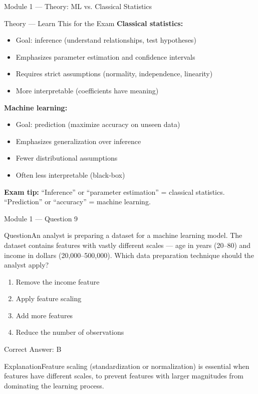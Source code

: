 \documentclass[aspectratio=169,10pt]{beamer}
\newcommand{\question}[1]{\begin{block}{Question}#1\end{block}}
\newcommand{\options}[4]{%
	\begin{enumerate}[label=\Alph*.,leftmargin=*]
		\item #1
		\item #2
		\item #3
		\item #4
	\end{enumerate}
}
\newcommand{\answerbox}[1]{\begin{exampleblock}{Correct Answer: #1}\end{exampleblock}}
\newcommand{\explain}[1]{\begin{block}{Explanation}#1\end{block}}
\newcommand{\theory}[1]{%
	\begin{block}{Theory --- Learn This for the Exam}
		\small #1
	\end{block}
}
\begin{document}
	\begin{frame}{Module 1 --- Theory: ML vs. Classical Statistics}
		\theory{
			\textbf{Classical statistics:}
			\begin{itemize}
				\item Goal: inference (understand relationships, test hypotheses)
				\item Emphasizes parameter estimation and confidence intervals
				\item Requires strict assumptions (normality, independence, linearity)
				\item More interpretable (coefficients have meaning)
			\end{itemize}
			\textbf{Machine learning:}
			\begin{itemize}
				\item Goal: prediction (maximize accuracy on unseen data)
				\item Emphasizes generalization over inference
				\item Fewer distributional assumptions
				\item Often less interpretable (black-box)
			\end{itemize}
			\textbf{Exam tip:} ``Inference'' or ``parameter estimation'' = classical statistics. ``Prediction'' or ``accuracy'' = machine learning.
		}
	\end{frame}
	
	\begin{frame}{Module 1 --- Question 9}
		\question{An analyst is preparing a dataset for a machine learning model. The dataset contains features with vastly different scales --- age in years (20--80) and income in dollars (20,000--500,000). Which data preparation technique should the analyst apply?}
		\options{Remove the income feature}{Apply feature scaling}{Add more features}{Reduce the number of observations}
		\answerbox{B}
		\explain{Feature scaling (standardization or normalization) is essential when features have different scales, to prevent features with larger magnitudes from dominating the learning process.}
	\end{frame}
	
\end{document}
